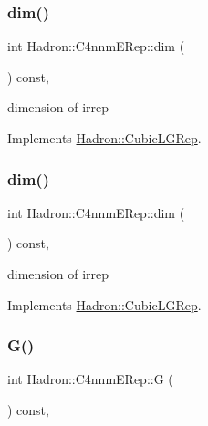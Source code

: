 \subsubsection{\texorpdfstring{dim()}{dim()}\hspace{0.1cm}{\footnotesize\ttfamily [1/2]}}
{\footnotesize\ttfamily int Hadron\+::\+C4nnm\+E\+Rep\+::dim (\begin{DoxyParamCaption}{ }\end{DoxyParamCaption}) const\hspace{0.3cm}{\ttfamily [inline]}, {\ttfamily [virtual]}}

dimension of irrep 

Implements \mbox{\hyperlink{structHadron_1_1CubicLGRep_a3acbaea26503ed64f20df693a48e4cdd}{Hadron\+::\+Cubic\+L\+G\+Rep}}.

\mbox{\label{structHadron_1_1C4nnmERep_ae5381e6e188b515505fbd5d6a7c6e7c9}} 
\subsubsection{\texorpdfstring{dim()}{dim()}\hspace{0.1cm}{\footnotesize\ttfamily [2/2]}}
{\footnotesize\ttfamily int Hadron\+::\+C4nnm\+E\+Rep\+::dim (\begin{DoxyParamCaption}{ }\end{DoxyParamCaption}) const\hspace{0.3cm}{\ttfamily [inline]}, {\ttfamily [virtual]}}

dimension of irrep 

Implements \mbox{\hyperlink{structHadron_1_1CubicLGRep_a3acbaea26503ed64f20df693a48e4cdd}{Hadron\+::\+Cubic\+L\+G\+Rep}}.

\mbox{\label{structHadron_1_1C4nnmERep_aeebb3eed0a37633aded692d6d5929f84}} 
\subsubsection{\texorpdfstring{G()}{G()}\hspace{0.1cm}{\footnotesize\ttfamily [1/2]}}
{\footnotesize\ttfamily int Hadron\+::\+C4nnm\+E\+Rep\+::G (\begin{DoxyParamCaption}{ }\end{DoxyParamCaption}) const\hspace{0.3cm}{\ttfamily [inline]}, {\ttfamily [virtual]}}

